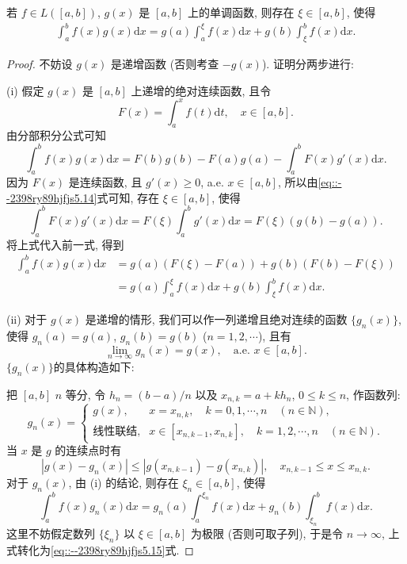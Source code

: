 \documentclass[../../main.tex]{subfiles}%
\begin{document}
\begin{theorem}[积分第二中值公式]\label{theorem:实变函数--积分第二中值公式}
若 $f\in L([a,b])$, $g(x)$ 是 $[a,b]$ 上的单调函数, 则存在 $\xi\in[a,b]$, 使得
\begin{align}
\int_a^b f(x)g(x)\mathrm{d}x = g(a)\int_a^\xi f(x)\mathrm{d}x + g(b)\int_\xi^b f(x)\mathrm{d}x. \label{eq::--2398ry89hjfjs5.15}
\end{align}
\end{theorem}
\begin{proof}

不妨设 $g(x)$ 是递增函数 (否则考查 $-g(x)$). 证明分两步进行:

(i) 假定 $g(x)$ 是 $[a,b]$ 上递增的绝对连续函数, 且令
\[
F(x) = \int_a^x f(t)\mathrm{d}t,\quad x\in[a,b].
\]
由分部积分公式可知
\[
\int_a^b f(x)g(x)\mathrm{d}x = F(b)g(b) - F(a)g(a) - \int_a^b F(x)g'(x)\mathrm{d}x.
\]
因为 $F(x)$ 是连续函数, 且 $g'(x)\geqslant 0$, a.e. $x\in[a,b]$, 所以由\eqref{eq::--2398ry89hjfjs5.14}式可知, 存在 $\xi\in[a,b]$, 使得
\[
\int_a^b F(x)g'(x)\mathrm{d}x = F(\xi)\int_a^b g'(x)\mathrm{d}x = F(\xi)(g(b)-g(a)).
\]
将上式代入前一式, 得到
\begin{align*}
\int_a^b f(x)g(x)\mathrm{d}x &= g(a)(F(\xi)-F(a)) + g(b)(F(b)-F(\xi)) \\
&= g(a)\int_a^\xi f(x)\mathrm{d}x + g(b)\int_\xi^b f(x)\mathrm{d}x.
\end{align*}

(ii) 对于 $g(x)$ 是递增的情形, 我们可以作一列递增且绝对连续的函数 $\{g_n(x)\}$, 使得 $g_n(a)=g(a)$, $g_n(b)=g(b)$ ($n=1,2,\cdots$), 且有
\[
\lim_{n\to\infty} g_n(x) = g(x),\quad \text{a.e. } x\in[a,b].
\]
$\{g_n(x)\}$的具体构造如下:

把 $[a,b]$ $n$ 等分, 令 $h_n = (b-a)/n$ 以及 $x_{n,k} = a + kh_n$, $0\leqslant k\leqslant n$, 作函数列:
\[
g_n(x) =
\begin{cases}
g(x), & x = x_{n,k}, \quad k=0,1,\cdots,n \quad (n\in\mathbb{N}), \\
\text{线性联结}, & x\in[x_{n,k-1},x_{n,k}], \quad k=1,2,\cdots,n \quad (n\in\mathbb{N}).
\end{cases}
\]
当 $x$ 是 $g$ 的连续点时有
\[
|g(x)-g_n(x)| \leqslant |g(x_{n,k-1})-g(x_{n,k})|,\quad x_{n,k-1}\leqslant x\leqslant x_{n,k}.
\]
对于 $g_n(x)$, 由 (i) 的结论, 则存在 $\xi_n\in[a,b]$, 使得
\[
\int_a^b f(x)g_n(x)\mathrm{d}x = g_n(a)\int_a^{\xi_n} f(x)\mathrm{d}x + g_n(b)\int_{\xi_n}^b f(x)\mathrm{d}x.
\]
这里不妨假定数列 $\{\xi_n\}$ 以 $\xi\in[a,b]$ 为极限 (否则可取子列), 于是令 $n\to\infty$, 上式转化为\eqref{eq::--2398ry89hjfjs5.15}式.

\end{proof}
\end{document}
